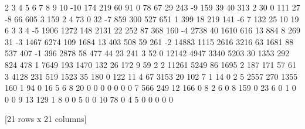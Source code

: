 \documentclass[letterpaper,10pt,english]{sphinxmanual}
\begin{document}
{\begin{sphinxVerbatim}[commandchars=\\\{\}]
        2     3     4     5    6     7    8    9    10
-10    174   219    60    91    0    78   67   29  243
-9     159    39    40   313    2    30    0  111   27
-8      66   605     3   159    2     4   73    0   32
-7     859   300   527   651    1   399   18  219  141
-6       7   132    25    10   19     6    3    3    4
-5    1906  1272   148  2131   22   252   87  368  160
-4    2738    40  1610   616   13   884    8  269   31
-3    1467  6274   109  1684   13   403  508   59  261
-2   14883  1115  2616  3216   63  1681   88  537  407
-1     396  2878    58   477   44    23  241    3   52
 0   12142  4947  3340  5203   30  1353  292  824  478
 1    7649   193  1470   132   26   172    9   59    2
 2   11261  5249    86  1695    2   187  171   57   61
 3    4128   231   519  1523   35   180    0  122   11
 4      67  3153    20   102    7     1   14    0    2
 5    2557   270  1355   160    1    94    0   16    5
 6       8    20     0     0    0     0    0    0    0
 7     566   249    12   166    0     8    2    6    0
 8     159     0    23     6    0     1    0    0    0
 9      13   129     1     8    0     0    5    0    0
 10     78     0     4     5    0     0    0    0    0

[21 rows x 21 columns]
\end{sphinxVerbatim}
}

{
\begin{sphinxVerbatim}[commandchars=\\\{\}]
\llap{\color{nbsphinxin}[74]:\,\hspace{\fboxrule}\hspace{\fboxsep}}   
\PYG{p}{[}\PYG{p}{]}   
\end{sphinxVerbatim}
}
\end{document}
